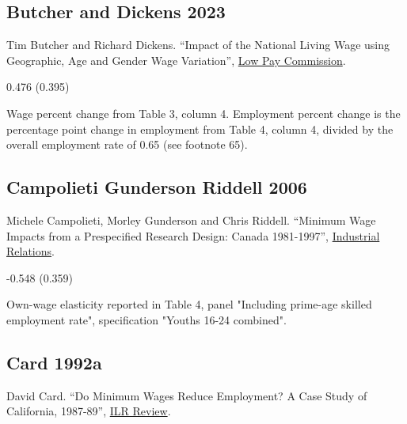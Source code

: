\subsection*{Butcher and Dickens 2023}
\vspace{-0.7em}

\noindent Tim Butcher and Richard Dickens. ``Impact of the National Living Wage using Geographic, Age and Gender Wage Variation'', \href{https://www.gov.uk/government/publications/national-living-wage-impacts-by-geography-age-and-gender}{Low Pay Commission}.

\vspace{0.7em}

 0.476 (0.395)

\vspace{0.7em}

 Wage percent change from Table 3, column 4. Employment percent change is the percentage point change in employment from Table 4, column 4, divided by the overall employment rate of 0.65 (see footnote 65).

\subsection*{Campolieti Gunderson Riddell 2006}
\vspace{-0.7em}

\noindent Michele Campolieti, Morley Gunderson and Chris Riddell. ``Minimum Wage Impacts from a Prespecified Research Design: Canada 1981-1997'', \href{https://doi.org/10.1111/j.1468-232X.2006.00424.x}{Industrial Relations}.

\vspace{0.7em}

 -0.548 (0.359)

\vspace{0.7em}

 Own-wage elasticity reported in Table 4, panel "Including prime-age skilled employment rate", specification "Youths 16-24 combined".

\subsection*{Card 1992a}
\vspace{-0.7em}

\noindent David Card. ``Do Minimum Wages Reduce Employment? A Case Study of California, 1987-89'', \href{https://doi.org/10.1177/001979399204600104}{ILR Review}.

